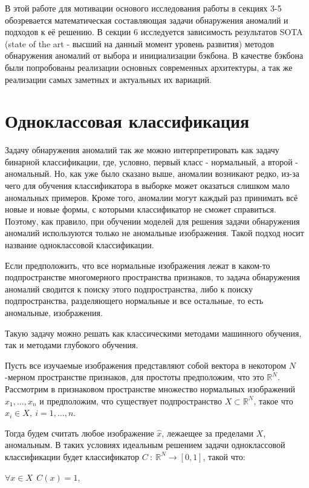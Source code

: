 \documentclass{article}
\begin{document}
\begin{large}
В этой работе для мотивации основого исследования работы в секциях 3-5 обозревается математическая составляющая задачи обнаружения аномалий и подходов к её решению. В секции 6 исследуется зависимость результатов SOTA (state of the art - высший на данный момент уровень развития) методов обнаружения аномалий от выбора и инициализации бэкбона. В качестве бэкбона были попробованы реализации основных современных архитектуры, а так же реализации самых заметных и актуальных их вариаций.

\section{Одноклассовая классификация}

Задачу обнаружения аномалий так же можно интерпретировать как задачу бинарной классификации, где, условно, первый класс - нормальный, а второй - аномальный. Но, как уже было сказано выше, аномалии возникают редко, из-за чего для обучения классификатора в выборке может оказаться слишком мало аномальных примеров. Кроме того, аномалии могут каждый раз принимать всё новые и новые формы, с которыми классификатор не сможет справиться. Поэтому, как правило, при обучении моделей для решения задачи обнаружения аномалий используются только не аномальные изображения. Такой подход носит название одноклассовой классификации.

Если предположить, что все нормальные изображения лежат в каком-то подпространстве многомерного пространства признаков, то задача обнаружения аномалий сводится к поиску этого подпространства, либо к поиску подпространства, разделяющего нормальные и все остальные, то есть аномальные, изображения. 

Такую задачу можно решать как классическими методами машинного обучения, так и методами глубокого обучения.

Пусть все изучаемые изображения представляют собой вектора в некотором $N$-мерном пространстве признаков, для простоты предположим, что это $\mathbb{R}^N$. Рассмотрим в признаковом пространстве множество нормальных изображений $x_1, ..., x_n$ и предположим, что существует подпространство $X \subset \mathbb{R}^N$, такое что $x_i \in X,\ i = 1, ..., n$.

Тогда будем считать любое изображение $\hat x$, лежаещее за пределами $X$, аномальным. В таких условиях идеальным решением задачи одноклассовой классификации будет классификатор $C \ : \ \mathbb{R}^N \rightarrow [0, 1]$, такой что:
\begin{center}
	$\forall x \in X \ \ C(x) = 1$,
	

\end{center}
\end{large}
\end{document}
